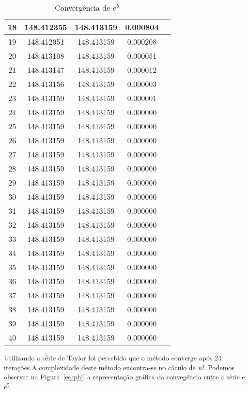 \begin{table}[H]
\begin{tabular}{|c|c|c|c|c|}
		\hline
		18 & 148.412355 & 148.413159 & 0.000804\\
		\hline
		19 & 148.412951 & 148.413159 & 0.000208\\
		\hline
		20 & 148.413108 & 148.413159 & 0.000051\\
		\hline
		21 & 148.413147 & 148.413159 & 0.000012\\
		\hline
		22 & 148.413156 & 148.413159 & 0.000003\\
		\hline
		23 & 148.413159 & 148.413159 & 0.000001\\
		\hline
		24 & 148.413159 & 148.413159 & 0.000000\\
		\hline
		25 & 148.413159 & 148.413159 & 0.000000\\
		\hline
		26 & 148.413159 & 148.413159 & 0.000000\\
		\hline
		27 & 148.413159 & 148.413159 & 0.000000\\
		\hline
		28 & 148.413159 & 148.413159 & 0.000000\\
		\hline
		29 & 148.413159 & 148.413159 & 0.000000\\
		\hline
		30 & 148.413159 & 148.413159 & 0.000000\\
		\hline
		31 & 148.413159 & 148.413159 & 0.000000\\
		\hline
		32 & 148.413159 & 148.413159 & 0.000000\\
		\hline
		33 & 148.413159 & 148.413159 & 0.000000\\
		\hline
		34 & 148.413159 & 148.413159 & 0.000000\\
		\hline
		35 & 148.413159 & 148.413159 & 0.000000\\
		\hline
		36 & 148.413159 & 148.413159 & 0.000000\\
		\hline
		37 & 148.413159 & 148.413159 & 0.000000\\
		\hline
		38 & 148.413159 & 148.413159 & 0.000000\\
		\hline
		39 & 148.413159 & 148.413159 & 0.000000\\
		\hline
		40 & 148.413159 & 148.413159 & 0.000000\\
		\hline
	\end{tabular}
	\label{ex_table}
	\caption{Convergência de $e^5$}
\end{table}

Utilizando a série de Taylor foi percebido que o método converge após 24
iterações.A complexidade deste método encontra-se no cáculo de \emph{n!}.
Podemos observar na Figura~\ref{eq:phi} a representação gráfica da convegência
entre a série e $e^5$. 


